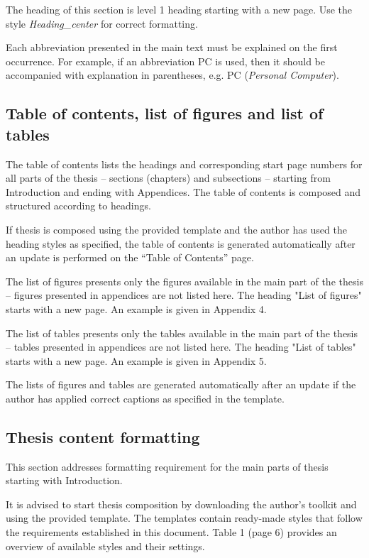 The heading of this section is level 1 heading starting with a new page. Use the style \textit{Heading\_center} for correct formatting.

Each abbreviation presented in the main text must be explained on the first occurrence.
For example, if an abbreviation PC is used, then it should be accompanied with explanation in parentheses, e.g. PC (\textit{Personal Computer}).

\subsection{Table of contents, list of figures and list of tables}

The table of contents lists the headings and corresponding start page numbers for all parts
of the thesis – sections (chapters) and subsections – starting from Introduction and ending
with Appendices. The table of contents is composed and structured according to headings.

If thesis is composed using the provided template and the author has used the heading styles as specified, the table of contents is generated automatically after an update is
performed on the “Table of Contents” page.

The list of figures presents only the figures available in the main part of the thesis -- figures
presented in appendices are not listed here. The heading "List of figures" starts with a new page. An example is given in Appendix 4.
 
The list of tables presents only the tables available in the main part of the thesis -- tables presented in appendices are not listed here. The heading "List of tables" starts with a new  page. An example is given in Appendix 5.
 
The lists of figures and tables are generated automatically after an update if the author has applied correct captions as specified in the template.

\subsection{Thesis content formatting}

This section addresses formatting requirement for the main parts of thesis starting with Introduction.

It is advised to start thesis composition by downloading the author’s toolkit and using the provided template. The templates contain ready-made styles that follow the requirements established in this document. Table 1 (page 6) provides an overview of available styles and their settings.


